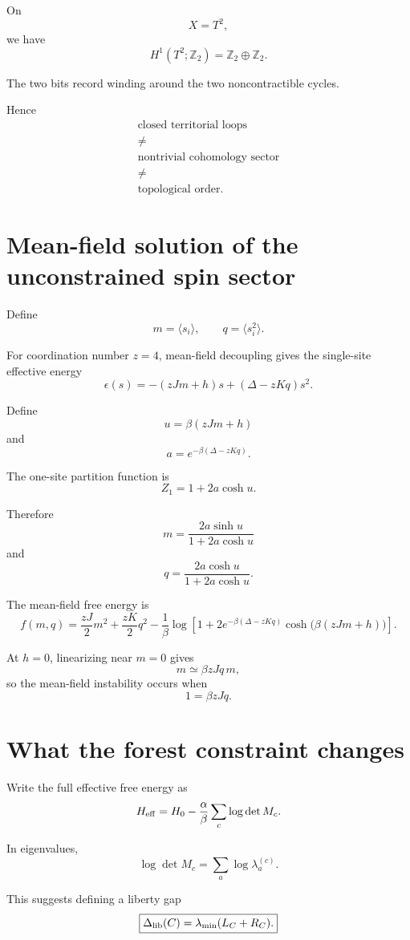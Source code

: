 \documentclass[11pt]{article}
\begin{document}
On
\[
X=T^2,
\]
we have
\[
H^1(T^2;\mathbb Z_2)
=
\mathbb Z_2\oplus\mathbb Z_2.
\]

The two bits record winding around the two noncontractible cycles.

Hence
\[
\boxed{
\begin{array}{c}
\text{closed territorial loops}\\
\neq\\
\text{nontrivial cohomology sector}\\
\neq\\
\text{topological order}.
\end{array}
}
\]

\section{Mean-field solution of the unconstrained spin sector}

Define
\[
m=\langle s_i\rangle,
\qquad
q=\langle s_i^2\rangle.
\]

For coordination number \(z=4\), mean-field decoupling gives the single-site effective energy
\[
\epsilon(s)
=
-(zJm+h)s
+
(\Delta-zKq)s^2.
\]

Define
\[
u=\beta(zJm+h)
\]
and
\[
a=e^{-\beta(\Delta-zKq)}.
\]

The one-site partition function is
\[
Z_1
=
1+2a\cosh u.
\]

Therefore
\[
\boxed{
m
=
\frac{2a\sinh u}
{1+2a\cosh u}
}
\]
and
\[
\boxed{
q
=
\frac{2a\cosh u}
{1+2a\cosh u}.
}
\]

The mean-field free energy is
\[
\boxed{
f(m,q)
=
\frac{zJ}{2}m^2
+
\frac{zK}{2}q^2
-
\frac1\beta
\log\!\left[
1+
2e^{-\beta(\Delta-zKq)}
\cosh\!\big(\beta(zJm+h)\big)
\right].
}
\]

At \(h=0\), linearizing near \(m=0\) gives
\[
m
\simeq
\beta zJ q\,m,
\]
so the mean-field instability occurs when
\[
\boxed{
1=\beta zJq.
}
\]

\section{What the forest constraint changes}

Write the full effective free energy as
\[
H_{\rm eff}
=
H_0
-
\frac{\alpha}{\beta}
\sum_c\log\det M_c.
\]

In eigenvalues,
\[
\log\det M_c
=
\sum_a\log\lambda_a^{(c)}.
\]

This suggests defining a liberty gap
\[
\boxed{
\Delta_{\rm lib}(C)
=
\lambda_{\min}(L_C+R_C).
}
\]
\end{document}
